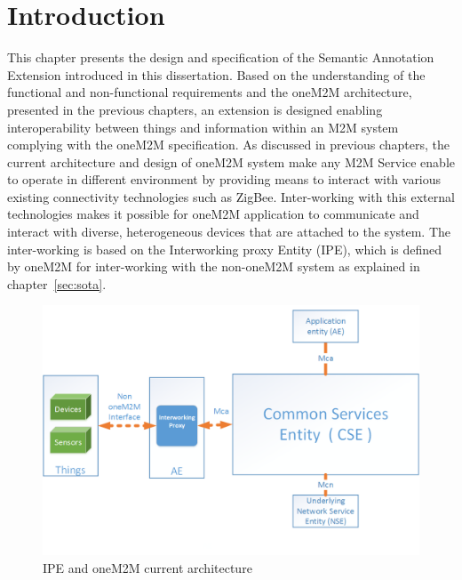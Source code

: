 \section{Introduction}
This chapter presents the design and specification of the Semantic Annotation Extension introduced in this dissertation. Based on the understanding of the functional and non-functional requirements and the oneM2M architecture, presented in the previous chapters, an extension is designed enabling interoperability between things and information within an M2M system complying with the oneM2M specification. As discussed in previous chapters, the current architecture and design of oneM2M system make any M2M Service enable to operate in different environment by providing means to interact with various existing connectivity technologies such as ZigBee. Inter-working with this external technologies makes it possible for oneM2M application to communicate and interact with diverse, heterogeneous devices that are attached to the system. The inter-working is based on the Interworking proxy Entity (IPE), which is defined by oneM2M for inter-working with the non-oneM2M system as explained in chapter~\ref{sec:sota}. \par
\begin{figure}[htbp]
    \centering
    \includegraphics[width=1\textwidth]{resources/images/ini}
    \caption{IPE and oneM2M current architecture}\label{fig:contrib2:cc}
\end{figure}
